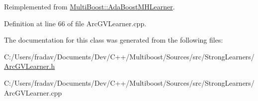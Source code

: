 Reimplemented from \hyperlink{classMultiBoost_1_1AdaBoostMHLearner_a1171d948bfa1875bf663993f067a8e8d}{Multi\-Boost\-::\-Ada\-Boost\-M\-H\-Learner}.



Definition at line 66 of file Arc\-G\-V\-Learner.\-cpp.



The documentation for this class was generated from the following files\-:\begin{DoxyCompactItemize}
\item 
C\-:/\-Users/fradav/\-Documents/\-Dev/\-C++/\-Multiboost/\-Sources/src/\-Strong\-Learners/\hyperlink{ArcGVLearner_8h}{Arc\-G\-V\-Learner.\-h}\item 
C\-:/\-Users/fradav/\-Documents/\-Dev/\-C++/\-Multiboost/\-Sources/src/\-Strong\-Learners/Arc\-G\-V\-Learner.\-cpp\end{DoxyCompactItemize}

